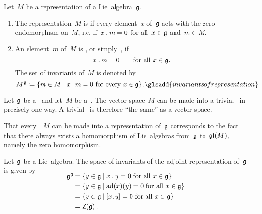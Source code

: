 \begin{definition}
	\label{trivial representations}
	Let~$M$ be a representation of a Lie~algebra~$\glie$.
	\begin{enumerate}
		\item
			The representation~$M$ is  if every element~$x$ of~$\glie$ acts with the zero endomorphism on~$M$, i.e. if~$x \mathbin{.} m = 0$ for all~$x \in \mathfrak{g}$ and~$m \in M$.
		\item
			An element~$m$ of~$M$ is , or simply~, if
			\[
				x \mathbin{.} m = 0
				\qquad
				\text{for all~$x \in \mathfrak{g}$.}
			\]
			The set of invariants of~$M$ is denoted by
			\[
				M^{\glie}
				\defined
				\{
					m \in M
				\suchthat
					\text{$x \act m = 0$ for every~$x \in \glie$}
				\}  \,.
				\glsadd{invariants of representation}
			\]
	\end{enumerate}
\end{definition}




\begin{remark}
	Let~$\glie$ be a~\liealgebra{$\kf$} and let~$M$ be a~\vectorspace{$\kf$}.
	The vector space~$M$ can be made into a trivial~\representation{$\glie$} in precisely one way.
	A trivial~\representation{$\glie$} is therefore \enquote{the same} as a vector space.

	That every~\vectorspace{$\kf$}~$M$ can be made into a representation of~$\glie$ corresponds to the fact that there always exists a homomorphism of Lie~algebras from~$\glie$ to~$\mathfrak{gl}(M)$, namely the zero homomorphism.
\end{remark}



\begin{example}
	Let~$\glie$ be a Lie~algebra.
	The space of invariants of the adjoint representation of~$\glie$ is given by
	\begin{align*}
		\SwapAboveDisplaySkip
		\glie^{\glie}
		&=
		\{
			y \in \glie
		\suchthat
			\text{$x \act y = 0$ for all~$x \in \glie$}
		\}
		\\
		&=
		\{
			y \in \glie
		\suchthat
			\text{$\ad(x)(y) = 0$ for all~$x \in \glie$}
		\}
		\\
		&=
		\{
			y \in \glie
		\suchthat
			\text{$[x,y] = 0$ for all~$x \in \glie$}
		\}
		\\
		&=
		\centerlie(\glie) \,.
	\end{align*}
\end{example}


